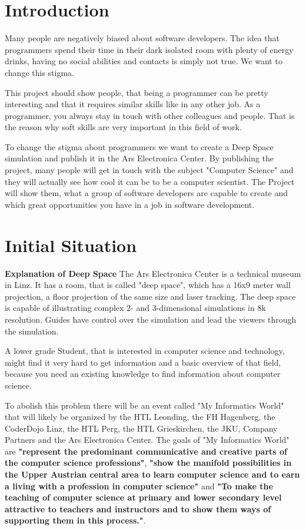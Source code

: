 \documentclass[12pt]{article}
\theoremstyle{definition}
\begin{document}
\section{Introduction}
Many people are negatively biased about software developers. The idea that programmers spend their time in their dark isolated room with plenty of energy drinks, having no social abilities and contacts is simply not true. We want to change this stigma.

This project should show people, that being a programmer can be pretty interesting and that it requires similar skills like in any other job. As a programmer, you always stay in touch with other colleagues and people. That is the reason why soft skills are very important in this field of work.

To change the stigma about programmers we want to create a Deep Space simulation and publish it in the Ars Electronica Center. By publishing the project, many people will get in touch with the subject "Computer Science" and they will actually see how cool it can be to be a computer scientist. The Project will show them, what a group of software developers are capable to create and which great opportunities you have in a job in software development.


\pagebreak

\section{Initial Situation}
\textbf{Explanation of Deep Space}\newline
The Ars Electronica Center is a technical museum in Linz. It has a room, that is called "deep space", which has a 16x9 meter wall projection, a floor projection of the same size and laser tracking. The deep space is capable of illustrating complex 2- and 3-dimensional simulations in 8k resolution. Guides have control over the simulation and lead the viewers through the simulation.

A lower grade Student, that is interested in computer science and technology, might find it very hard to get information and a basic overview of that field, because you need an existing knowledge to find information about computer science. 

To abolish this problem there will be an event called "My Informatics World" that will likely be organized by the HTL Leonding, the FH Hagenberg, the CoderDojo Linz, the HTL Perg, the HTL Grieskirchen, the JKU, Company Partners and the Ars Electronica Center. The goals of "My Informatics World" are \textbf{"represent the predominant communicative and creative parts of the computer science professions"}, \textbf{"show the manifold possibilities in the Upper Austrian central area to learn computer science and to earn a living with a profession in computer science"} and \textbf{"To make the teaching of computer science at primary and lower secondary level attractive to teachers and instructors and to show them ways of supporting them in this process."}.
\end{document}
